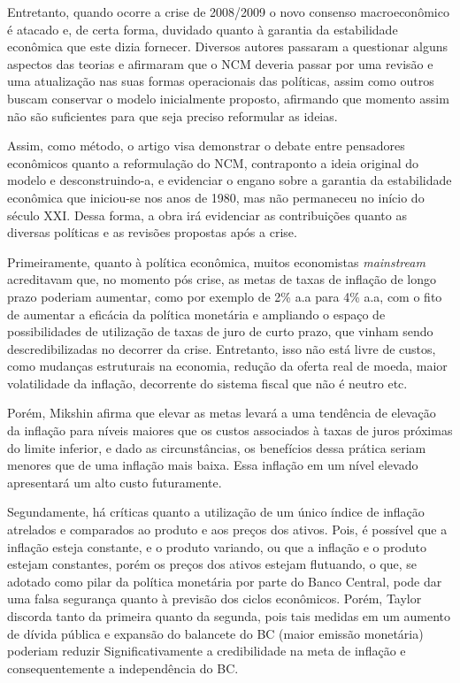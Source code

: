 \documentclass[report]{uftex}
\begin{document}
Entretanto, quando ocorre a crise de 2008/2009 o novo consenso macroeconômico é atacado e, de certa forma, duvidado quanto à garantia da estabilidade econômica que este dizia fornecer. Diversos autores passaram a questionar alguns aspectos das teorias e afirmaram que o NCM deveria passar por uma revisão e uma atualização nas suas formas operacionais das políticas, assim como outros buscam conservar o modelo inicialmente proposto, afirmando que momento assim não são suficientes para que seja preciso reformular as ideias. 

Assim, como método, o artigo visa demonstrar o debate entre pensadores econômicos quanto a reformulação do NCM, contraponto a ideia original do modelo e desconstruindo-a, e evidenciar o engano sobre a garantia da estabilidade econômica que iniciou-se nos anos de 1980, mas não permaneceu no início do século XXI. Dessa forma, a obra irá evidenciar as contribuições quanto as diversas políticas e as revisões propostas após a crise. 

Primeiramente, quanto à política econômica, muitos economistas \textit{mainstream} acreditavam que, no momento pós crise, as metas de taxas de inflação de longo prazo poderiam aumentar, como por exemplo de 2\% a.a para 4\% a.a, com o fito de aumentar a eficácia da política monetária e ampliando o espaço de possibilidades de utilização de taxas de juro de curto prazo, que vinham sendo descredibilizadas no decorrer da crise. Entretanto, isso não está livre de custos, como mudanças estruturais na economia, redução da oferta real de moeda, maior volatilidade da inflação, decorrente do sistema fiscal que não é neutro etc.

Porém, Mikshin afirma que elevar as metas levará a uma tendência de elevação da inflação para níveis maiores que os custos associados à taxas de juros próximas do limite inferior, e dado as circunstâncias, os benefícios dessa prática seriam menores que de uma inflação mais baixa. Essa inflação em um nível elevado apresentará um alto custo futuramente. 

Segundamente, há críticas quanto a utilização de um único índice de inflação atrelados e comparados ao produto e aos preços dos ativos. Pois, é possível que a inflação esteja constante, e o produto variando, ou que a inflação e o produto estejam constantes, porém os preços dos ativos estejam flutuando, o que, se adotado como pilar da política monetária por parte do Banco Central, pode dar uma falsa segurança quanto à previsão dos ciclos econômicos. Porém, Taylor discorda tanto da primeira quanto da segunda, pois tais medidas em um aumento de dívida pública e expansão do balancete do BC (maior emissão monetária) poderiam reduzir Significativamente a credibilidade na meta de inflação e consequentemente a independência do BC.
\end{document}
